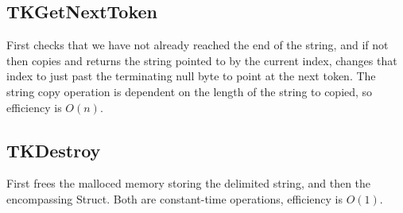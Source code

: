\documentclass[letterpaper,12pt]{article}
\begin{document}
\subsection{TKGetNextToken}
First checks that we have not already reached the end of the string, and if not
then copies and returns the string pointed to by the current index, changes that
index to just past the terminating null byte to point at the next token. The
string copy operation is dependent on the length of the string to copied, so
efficiency is $O(n)$.

\subsection{TKDestroy}
First frees the malloced memory storing the delimited string, and then the
encompassing Struct. Both are constant-time operations, efficiency is $O(1)$.
\end{document}
